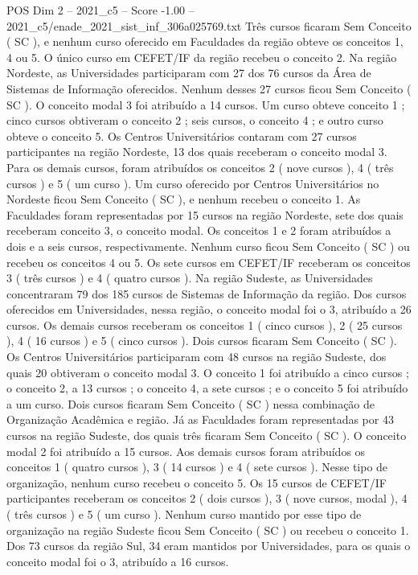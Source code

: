 \begin{textsample}{POS Dim 2 – 2021\_c5 – Score -1.00 – 2021\_c5/enade\_2021\_sist\_inf\_306a025769.txt}
Três cursos ficaram Sem Conceito ( SC ), e nenhum curso oferecido em Faculdades da região obteve os conceitos 1, 4 ou 5.
O único curso em CEFET/IF da região recebeu o conceito 2.
Na região Nordeste, as Universidades participaram com 27 dos 76 cursos da Área de Sistemas de Informação oferecidos.
Nenhum desses 27 cursos ficou Sem Conceito ( SC ).
O conceito modal 3 foi atribuído a 14 cursos.
Um curso obteve conceito 1 ; cinco cursos obtiveram o conceito 2 ; seis cursos, o conceito 4 ; e outro curso obteve o conceito 5.
Os Centros Universitários contaram com 27 cursos participantes na região Nordeste, 13 dos quais receberam o conceito modal 3.
Para os demais cursos, foram atribuídos os conceitos 2 ( nove cursos ), 4 ( três cursos ) e 5 ( um curso ).
Um curso oferecido por Centros Universitários no Nordeste ficou Sem Conceito ( SC ), e nenhum recebeu o conceito 1.
As Faculdades foram representadas por 15 cursos na região Nordeste, sete dos quais receberam conceito 3, o conceito modal.
Os conceitos 1 e 2 foram atribuídos a dois e a seis cursos, respectivamente.
Nenhum curso ficou Sem Conceito ( SC ) ou recebeu os conceitos 4 ou 5.
Os sete cursos em CEFET/IF receberam os conceitos 3 ( três cursos ) e 4 ( quatro cursos ).
Na região Sudeste, as Universidades concentraram 79 dos 185 cursos de Sistemas de Informação da região.
Dos cursos oferecidos em Universidades, nessa região, o conceito modal foi o 3, atribuído a 26 cursos.
Os demais cursos receberam os conceitos 1 ( cinco cursos ), 2 ( 25 cursos ), 4 ( 16 cursos ) e 5 ( cinco cursos ).
Dois cursos ficaram Sem Conceito ( SC ).
Os Centros Universitários participaram com 48 cursos na região Sudeste, dos quais 20 obtiveram o conceito modal 3.
O conceito 1 foi atribuído a cinco cursos ; o conceito 2, a 13 cursos ; o conceito 4, a sete cursos ; e o conceito 5 foi atribuído a um curso.
Dois cursos ficaram Sem Conceito ( SC ) nessa combinação de Organização Acadêmica e região.
Já as Faculdades foram representadas por 43 cursos na região Sudeste, dos quais três ficaram Sem Conceito ( SC ).
O conceito modal 2 foi atribuído a 15 cursos.
Aos demais cursos foram atribuídos os conceitos 1 ( quatro cursos ), 3 ( 14 cursos ) e 4 ( sete cursos ).
Nesse tipo de organização, nenhum curso recebeu o conceito 5.
Os 15 cursos de CEFET/IF participantes receberam os conceitos 2 ( dois cursos ), 3 ( nove cursos, modal ), 4 ( três cursos ) e 5 ( um curso ).
Nenhum curso mantido por esse tipo de organização na região Sudeste ficou Sem Conceito ( SC ) ou recebeu o conceito 1.
Dos 73 cursos da região Sul, 34 eram mantidos por Universidades, para os quais o conceito modal foi o 3, atribuído a 16 cursos.

\end{textsample}
